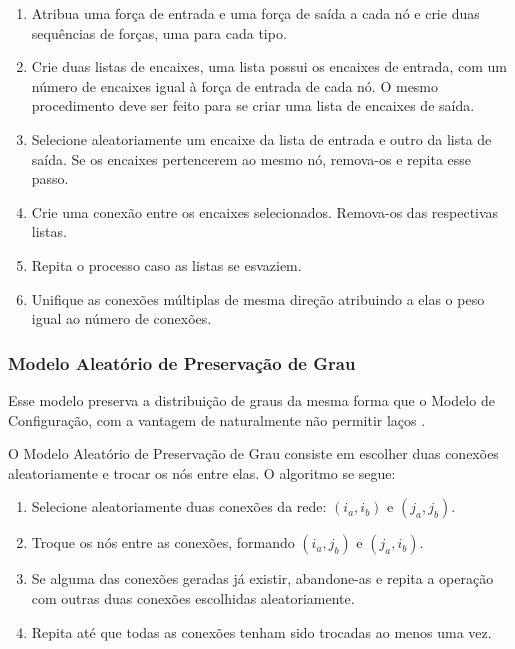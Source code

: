 \documentclass[12pt,a4paper,final]{article}
\begin{document}
\begin{enumerate}
\item Atribua uma força de entrada e uma força de saída a cada nó e crie duas sequências de forças, uma para cada tipo.
\item Crie duas listas de encaixes, uma lista possui os encaixes de entrada, com um número de encaixes igual à força de entrada de cada nó. O mesmo procedimento deve ser feito para se criar uma lista de encaixes de saída.
\item Selecione aleatoriamente um encaixe da lista de entrada e outro da lista de saída. Se os encaixes pertencerem ao mesmo nó, remova-os e repita esse passo.
\item Crie uma conexão entre os encaixes selecionados. Remova-os das respectivas listas.
\item Repita o processo caso as listas se esvaziem.
\item Unifique as conexões múltiplas de mesma direção atribuindo a elas o peso igual ao número de conexões.
\end{enumerate}

\subsubsection{Modelo Aleatório de Preservação de Grau} \label{sec:modelo-preservacao-grau}

Esse modelo preserva a distribuição de graus da mesma forma que o Modelo de Configuração, com a vantagem de naturalmente não permitir laços \cite{Barabasi2016-rn}.

O Modelo Aleatório de Preservação de Grau consiste em escolher duas conexões aleatoriamente e trocar os nós entre elas. O algoritmo se segue:

\begin{enumerate}
\item Selecione aleatoriamente duas conexões da rede: $(i_a, i_b)$ e $(j_a, j_b)$.
\item Troque os nós entre as conexões, formando $(i_a, j_b)$ e $(j_a, i_b)$. 
\item Se alguma das conexões geradas já existir, abandone-as e repita a operação com outras duas conexões escolhidas aleatoriamente.
\item Repita até que todas as conexões tenham sido trocadas ao menos uma vez.
\end{enumerate}
\end{document}
